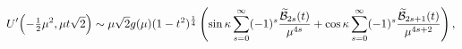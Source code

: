 \[\mathop{U\/}\nolimits'\!\left(-\tfrac{1}{2}\mu^{2},\mu t\sqrt{2}\right)\sim\mu%
\sqrt{2}g(\mu)(1-t^{2})^{\frac{1}{4}}\*\left(\mathop{\sin\/}\nolimits\kappa%
\sum_{s=0}^{\infty}(-1)^{s}\frac{\widetilde{\cal{B}}_{2s}(t)}{\mu^{4s}}+%
\mathop{\cos\/}\nolimits\kappa\sum_{s=0}^{\infty}(-1)^{s}\frac{\widetilde{\cal%
{B}}_{2s+1}(t)}{\mu^{4s+2}}\right),\]
